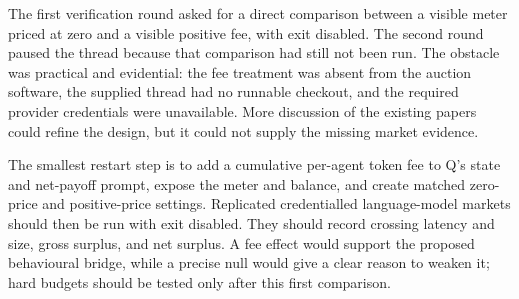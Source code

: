 \documentclass{article}
\begin{document}
The first verification round asked for a direct comparison between a visible meter priced at zero and a visible positive fee, with exit disabled.  The second round paused the thread because that comparison had still not been run.  The obstacle was practical and evidential: the fee treatment was absent from the auction software, the supplied thread had no runnable checkout, and the required provider credentials were unavailable.  More discussion of the existing papers could refine the design, but it could not supply the missing market evidence.

The smallest restart step is to add a cumulative per-agent token fee to Q's state and net-payoff prompt, expose the meter and balance, and create matched zero-price and positive-price settings.  Replicated credentialled language-model markets should then be run with exit disabled.  They should record crossing latency and size, gross surplus, and net surplus.  A fee effect would support the proposed behavioural bridge, while a precise null would give a clear reason to weaken it; hard budgets should be tested only after this first comparison.



\end{document}
